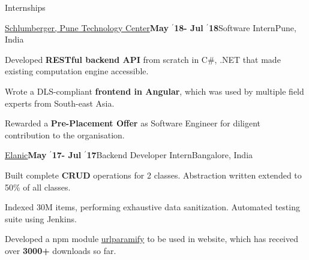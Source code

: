 \documentclass{resume} %
\begin{document}
\begin{rSection}{Internships}
\begin{rSubsection}{\large \href{https://drive.google.com/file/d/1EcfIC_g8bx3whaxMdOkFyZx4TCqA1RAq/view?usp=sharing}{Schlumberger, Pune Technology Center}}{\textbf{\large May $^{\prime}$18- Jul $^{\prime}$18}}{Software Intern}{Pune, India}
\item Developed {\bf RESTful backend API} from scratch in C\#, .NET that made existing computation engine accessible.
\item Wrote a DLS-compliant {\bf frontend in Angular}, which was used  by multiple field experts from South-east Asia.
\item Rewarded a {\bf Pre-Placement Offer} as Software Engineer for diligent contribution to the organisation.
\end{rSubsection}

\vspace{-0.7em}
\begin{rSubsection}{\large \href{https://drive.google.com/file/d/0B5iU6cWw36rOVWZIcllPY3RSd2c/view?usp=sharing}{Elanic}}{\textbf{\large May $^{\prime}$17- Jul $^{\prime}$17}}{Backend Developer Intern}{Bangalore, India}
\item Built complete \textbf{CRUD} operations for 2 classes. Abstraction written extended to 50\% of all classes.
\item Indexed 30M items, performing exhaustive data sanitization. Automated testing suite using Jenkins.
\item Developed a npm module \href{https://www.npmjs.com/package/urlparamify}{urlparamify} to be used in website, which has received over \textbf{3000+} downloads so far.
\end{rSubsection}


\end{rSection}


\end{document}
